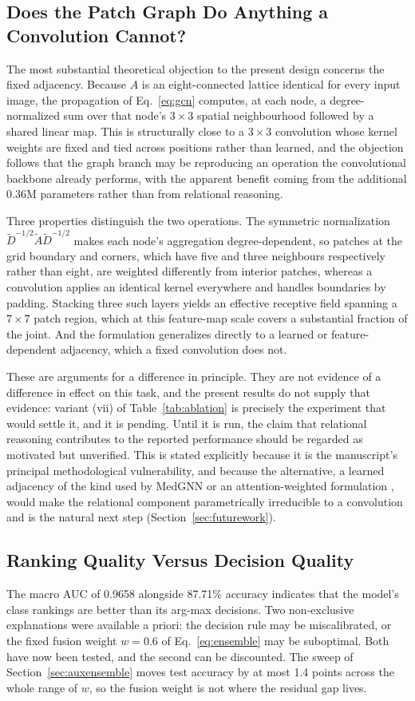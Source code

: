 \documentclass[journal]{IEEEtran}
\begin{document}
\subsection{Does the Patch Graph Do Anything a Convolution Cannot?}
The most substantial theoretical objection to the present design concerns the
fixed adjacency. Because $A$ is an eight-connected lattice identical for every
input image, the propagation of Eq.~\eqref{eq:gcn} computes, at each node, a
degree-normalized sum over that node's $3\times3$ spatial neighbourhood followed
by a shared linear map. This is structurally close to a $3\times3$ convolution
whose kernel weights are fixed and tied across positions rather than learned,
and the objection follows that the graph branch may be reproducing an operation
the convolutional backbone already performs, with the apparent benefit coming
from the additional 0.36M parameters rather than from relational reasoning.

Three properties distinguish the two operations. The symmetric normalization
$\tilde{D}^{-1/2}\tilde{A}\tilde{D}^{-1/2}$ makes each node's aggregation
degree-dependent, so patches at the grid boundary and corners, which have five
and three neighbours respectively rather than eight, are weighted differently
from interior patches, whereas a convolution applies an identical kernel
everywhere and handles boundaries by padding. Stacking three such layers yields
an effective receptive field spanning a $7\times7$ patch region, which at this
feature-map scale covers a substantial fraction of the joint. And the
formulation generalizes directly to a learned or feature-dependent adjacency,
which a fixed convolution does not.

These are arguments for a difference in principle. They are not evidence of a
difference in effect on this task, and the present results do not supply that
evidence: variant (vii) of Table~\ref{tab:ablation} is precisely the experiment
that would settle it, and it is pending. Until it is run, the claim that
relational reasoning contributes to the reported performance should be regarded
as motivated but unverified. This is stated explicitly because it is the
manuscript's principal methodological vulnerability, and because the
alternative, a learned adjacency of the kind used by MedGNN
\cite{ye2025medgnn} or an attention-weighted formulation \cite{velickovic2018graph},
would make the relational component parametrically irreducible to a convolution
and is the natural next step (Section~\ref{sec:futurework}).

\subsection{Ranking Quality Versus Decision Quality}
The macro AUC of 0.9658 alongside 87.71\% accuracy indicates that the model's
class rankings are better than its arg-max decisions. Two non-exclusive
explanations were available a priori: the decision rule may be miscalibrated, or
the fixed fusion weight $w = 0.6$ of Eq.~\eqref{eq:ensemble} may be suboptimal.
Both have now been tested, and the second can be discounted. The sweep of
Section~\ref{sec:auxensemble} moves test accuracy by at most 1.4 points across
the whole range of $w$, so the fusion weight is not where the residual gap
lives.
\end{document}
